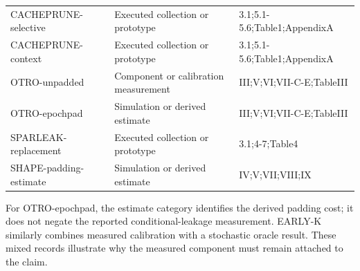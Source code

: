 \begin{longtable}{@{}p{}p{}p{}@{}}
CACHEPRUNE-selective~\cite{wu2026cacheprune} & Executed collection or prototype & 3.1;5.1-5.6;Table1;AppendixA\\
CACHEPRUNE-context~\cite{wu2026cacheprune} & Executed collection or prototype & 3.1;5.1-5.6;Table1;AppendixA\\
OTRO-unpadded~\cite{lee2026otro} & Component or calibration measurement & III;V;VI;VII-C-E;TableIII\\
OTRO-epochpad~\cite{lee2026otro} & Simulation or derived estimate & III;V;VI;VII-C-E;TableIII\\
SPARLEAK-replacement~\cite{chen2026sparleak} & Executed collection or prototype & 3.1;4-7;Table4\\
SHAPE-padding-estimate~\cite{hadad2026shape} & Simulation or derived estimate & IV;V;VII;VIII;IX\\
\bottomrule\end{longtable}
For OTRO-epochpad, the estimate category identifies the derived padding cost; it does not negate the reported conditional-leakage measurement. EARLY-K similarly combines measured calibration with a stochastic oracle result. These mixed records illustrate why the measured component must remain attached to the claim.
